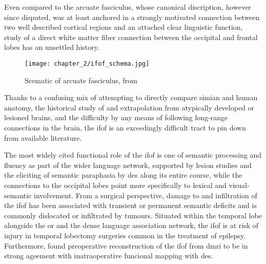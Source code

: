 Even compared to the arcuate fasciculus, whose canonical discription, however since disputed, was at least anchored in a strongly motivated connection between two well described cortical regions and an attached clear linguistic function, study of a direct white matter fiber connection between the occipital and frontal lobes has an unsettled history.\autocite{Forkel2014a}
\begin{SCfigure}[][htb!]
  \texttt{[image: chapter\_2/ifof\_schema.jpg]}
  \caption{ Scematic of arcuate fasciculus, from \textcite{Geschwind1970}}
  \label{fig:ifof}
\end{SCfigure}
Thanks to a confusing mix of attempting to directly compare simian and human anatomy,\autocite{Schmahmann2007,ThiebautdeSchotten2012,Mandonnet2018,Sarubbo2019} the historical study of and extrapolation from atypically developed or lesioned brains,\autocite{Schmahmann2007,Forkel2014a} and the difficulty by any means of following long-range connections in the brain,
\autocite{Martino2010} the \gls{ifof} is an exceedingly difficult tract to pin down from available literature.\autocite{Sarubbo2019,Weiller2021}

The most widely cited functional role of the \gls{ifof} is one of semantic processing and fluency as part of the wider language network, supported by lesion studies\autocite{Ille2018b,Almairac2015} and the eliciting of semantic paraphasia by \gls{des} along its entire course,\autocite{Duffau2013a,Herbet2017,Voets2017} while the connections to the occipital lobes point more specifically to lexical and visual-semantic involvement.
\autocite{Martino2010,Rollans2017,Rollans2018}
From a surgical perspective, damage to and infiltration of the \gls{ifof} has been associated with transient or permanent semantic deficits and is commonly dislocated or infiltrated by tumours. \autocite{Almairac2015,Voets2017,Altieri2019,Binding2023}
Situated within the temporal lobe alongside the \gls{or} and the dense language association network, the \gls{ifof} is at risk of injury in temporal lobectomy surgeries common in the treatment of epilepsy. \autocite{Baran2020,Shah2022,Binding2023}
Furthermore, \textcite{Bello2010d} found preoperative reconstruction of the \gls{ifof} from \gls{dmri} to be in strong ageement with inatraoperative funcional mapping with \gls{des}.

